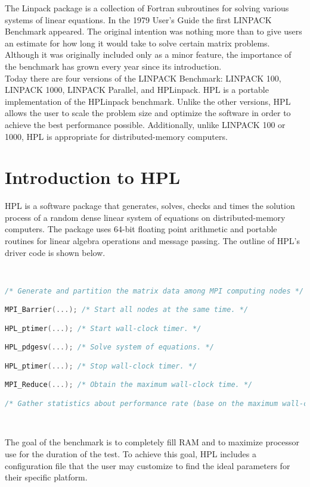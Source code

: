 \documentclass[a4paper, 11pt]{article}
\begin{document}
The Linpack package is a collection of Fortran subroutines for solving various systems of linear equations. In the 1979 User's Guide the first LINPACK Benchmark appeared. The original intention was nothing more than to give users an estimate for how long it would take to solve certain matrix problems. Although it was originally included only as a minor feature, the importance of the benchmark has grown every year since its introduction.\cite{website:faq}\\

Today there are four versions of the LINPACK Benchmark: LINPACK 100, LINPACK 1000, LINPACK Parallel, and HPLinpack. HPL is a portable implementation of the HPLinpack benchmark. Unlike the other versions, HPL allows the user to scale the problem size and optimize the software in order to achieve the best performance possible. Additionally, unlike LINPACK 100 or 1000, HPL is appropriate for distributed-memory computers.

\section{Introduction to HPL}

HPL is a software package that generates, solves, checks and times the solution process of a random dense linear system of equations on distributed-memory computers. The package uses 64-bit floating point arithmetic and portable routines for linear algebra operations and message passing. The outline of HPL's driver code is shown below.\cite{website:paper}

\

\begin{lstlisting}[language=C]
/* Generate and partition the matrix data among MPI computing nodes */

MPI_Barrier(...); /* Start all nodes at the same time. */

HPL_ptimer(...); /* Start wall-clock timer. */

HPL_pdgesv(...); /* Solve system of equations. */

HPL_ptimer(...); /* Stop wall-clock timer. */

MPI_Reduce(...); /* Obtain the maximum wall-clock time. */

/* Gather statistics about performance rate (base on the maximum wall-clock time) and accuracy of the solution. */
\end{lstlisting}

\

The goal of the benchmark is to completely fill RAM and to maximize processor use for the duration of the test. To achieve this goal, HPL includes a configuration file that the user may customize to find the ideal parameters for their specific platform.
\end{document}

